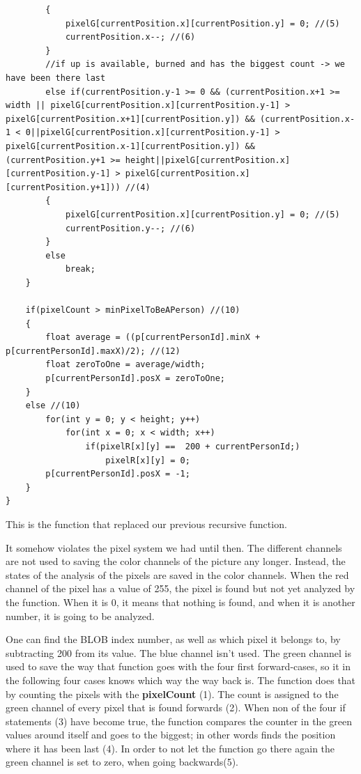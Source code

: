\begin{lstlisting}
		{
			pixelG[currentPosition.x][currentPosition.y] = 0; //(5)
			currentPosition.x--; //(6)
		}
		//if up is available, burned and has the biggest count -> we have been there last
		else if(currentPosition.y-1 >= 0 && (currentPosition.x+1 >= width || pixelG[currentPosition.x][currentPosition.y-1] > pixelG[currentPosition.x+1][currentPosition.y]) && (currentPosition.x-1 < 0||pixelG[currentPosition.x][currentPosition.y-1] > pixelG[currentPosition.x-1][currentPosition.y]) && (currentPosition.y+1 >= height||pixelG[currentPosition.x][currentPosition.y-1] > pixelG[currentPosition.x][currentPosition.y+1])) //(4)
		{
			pixelG[currentPosition.x][currentPosition.y] = 0; //(5)
			currentPosition.y--; //(6)
		}
		else
			break;
	}
	
	if(pixelCount > minPixelToBeAPerson) //(10)
	{
		float average = ((p[currentPersonId].minX + p[currentPersonId].maxX)/2); //(12)
		float zeroToOne = average/width;
		p[currentPersonId].posX = zeroToOne;
	}
	else //(10)
		for(int y = 0; y < height; y++)
			for(int x = 0; x < width; x++)
				if(pixelR[x][y] ==  200 + currentPersonId;)
					pixelR[x][y] = 0;
		p[currentPersonId].posX = -1;
	}
}
\end{lstlisting}
This is the function that replaced our previous recursive function.

It somehow violates the pixel system we had until then. The different channels are not used to saving the color channels of the picture any longer. Instead, the states of the analysis of the pixels are saved in the color channels. When the red channel of the pixel has a value of 255, the pixel is found but not yet analyzed by the function. When it is 0, it means that nothing is found, and when it is another number, it is going to be analyzed.

One can find the BLOB index number, as well as which pixel it belongs to, by subtracting 200 from its value. The blue channel isn't used. The green channel is used to save the way that function goes with the four first forward-cases, so it in the following four cases knows which way the way back is. The function does that by counting the pixels with the \textbf{pixelCount} (1). The count is assigned to the green channel of every pixel that is found forwards (2). When non of the four if statements (3) have become true, the function compares the counter in the green values around itself and goes to the biggest; in other words finds the position where it has been last (4). In order to not let the function go there again the green channel is set to zero, when going backwards(5).

